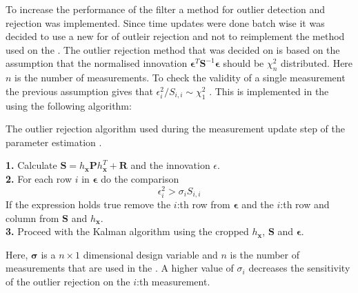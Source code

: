 To increase the performance of the filter a method for outlier detection and rejection was implemented. Since time updates were done batch wise it was decided to use a new for of outleir rejection and not to reimplement the method used on the \abbrROV. The outlier rejection method that was decided on is based on the assumption that the normalised innovation $\boldsymbol{\epsilon}^T \boldsymbol{S}^{-1} \boldsymbol{\epsilon}$ should be $\chi_{n}^{2}$ distributed. Here $n$ is the number of measurements. To check the validity of a single measurement the previous assumption gives that $\epsilon_i^{2}/S_{i,i} \sim \chi_{1}^{2}$ \citep{sensorfusion}. This is implemented in the \abbrEKF using the following algorithm:
\begin{algorithm}[tpb]
\label{alg:outlier}
\caption{The outlier rejection algorithm used during the measurement update step of the parameter estimation \abbrEKF.}
\textbf{1.} Calculate $\boldsymbol{S}=h_{\boldsymbol{x}} \boldsymbol{P} h_{\boldsymbol{x}}^T + \boldsymbol{R}$ and the innovation $\epsilon$.
\\
\textbf{2.} For each row $i$ in $\boldsymbol{\epsilon}$ do the comparison
\begin{equation}
\epsilon_{i}^{2} > \sigma_i S_{i,i}
\end{equation}
If the expression holds true remove the $i$:th row from $\boldsymbol{\epsilon}$ and the $i$:th row and column from $\boldsymbol{S}$ and $h_{\boldsymbol{x}}$.\\
\textbf{3.} Proceed with the Kalman algorithm using the cropped $h_{\boldsymbol{x}}$, $\boldsymbol{S}$ and $\boldsymbol{\epsilon}$.
\end{algorithm}
Here, $\boldsymbol{\sigma}$ is a $n\times1$ dimensional design variable and $n$ is the number of measurements that are used in the \abbrEKF. A higher value of $\sigma_i$ decreases the sensitivity of the outlier rejection on the $i$:th measurement.

